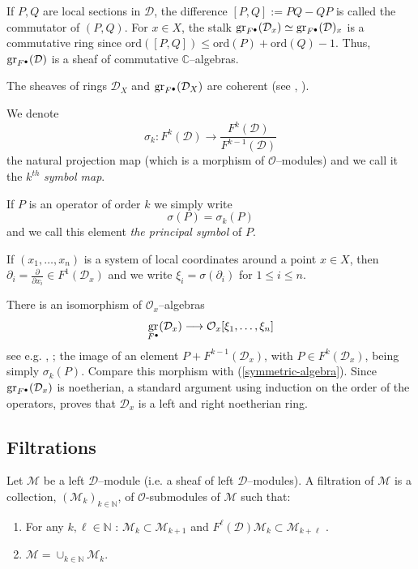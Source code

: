 \documentclass[12pt]{article}
\newcommand{\CC}{\mathbb{C}}
\newcommand{\NN}{\mathbb{N}}
\DeclareMathOperator{\gr}{\rm gr}
\newcommand{\OO}{\mathcal{O}}
\newcommand{\DD}{\mathcal{D}}
\newcommand{\cM}{\mathcal{M}}
\newcommand{\ord}{{\mathrm{ord}}}
\newcommand{\cD}{\DD}
\newcommand{\cO}{\OO}
\newcommand\beq{\begin{equation}}
\newcommand\eeq{\end{equation}}
\begin{document}
If $P,Q$ are local sections in $\DD$, the difference $[P,Q]:=PQ-QP$ is called the commutator of $(P,Q)$.
For $x\in X$, the stalk $\gr_{F^\bullet}(\DD_x) \simeq \gr_{F^\bullet}(\DD)_x$
is a commutative ring since $\ord([P,Q]) \leq \ord(P)+\ord(Q)-1$. Thus, $\gr_{F^\bullet}(\DD)$ is a sheaf of commutative $\CC$--algebras.

The sheaves of rings $\DD_X$ and $\gr_{F^\bullet}(\DD_X)$ are coherent (see \cite[I, Th. 3.2]{sem-gre-1975}, \cite[Prop. 9]{Granger-Maisonobe-cimpa-niza}).

We denote  $$\sigma_k : F^{k}(\DD) \rightarrow  \frac{F^k(\DD)}{F^{k-1}(\DD)}$$ the natural projection map (which is a morphism of $\OO$--modules) and we call it the $k^{th}$ {\em symbol map}.

If $P$ is an operator of order $k$ we simply write $$\sigma(P)=\sigma_k(P)$$ and we call this element {\em the principal symbol} of $P$.

If $(x_1,\ldots,x_n)$ is a system of local coordinates around a point  $x\in X$, then $\partial_i=\frac{\partial}{\partial x_i} \in F^1(\DD_x)$ and we write $\xi_i = \sigma(\partial_i)$ for $1\leq i \leq n$.

There is an isomorphism of $\cO_x$--algebras
\beq\label{grD-O-xi}
\gr_{F^\bullet}(\DD_x) \longrightarrow \cO_x[\xi_1,\ldots,\xi_n]
\eeq
see e.g. \cite[I, \S 1]{sem-gre-1975}, \cite[Prop. 4]{Granger-Maisonobe-cimpa-niza};  the image of an element $P+F^{k-1}(\DD_x)$, with $P\in F^k(\DD_x)$, being simply $\sigma_k(P)$. Compare this morphism with (\ref{symmetric-algebra}). Since $\gr_{F^\bullet}(\cD_x)$ is noetherian, a standard argument using induction on the order of the operators, proves that $\cD_x$ is a left and right noetherian ring.


\subsection{Filtrations}

Let $\cM$ be a left $\DD$--module (i.e. a sheaf of left $\DD$--modules). A filtration of $\cM$ is a collection, $(\cM_k)_{k\in \NN}$, of $\cO$-submodules of $\cM$ such that:
\begin{enumerate}
\item[(i)] For any $k,\ell \in \NN$ : $\cM_k \subset \cM_{k+1}$ and $F^{\ell}(\DD)\cM_k \subset \cM_{k+\ell}$ .
\item[(ii)] $\cM = \cup_{k\in\NN} \cM_k$.
\end{enumerate}
\end{document}
